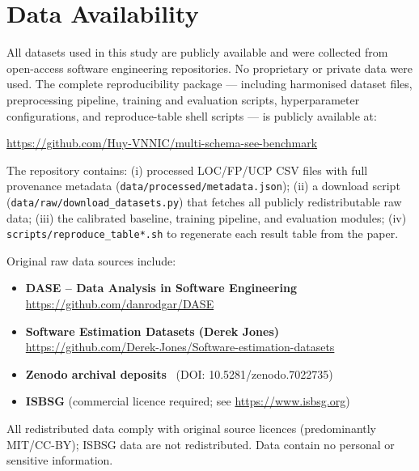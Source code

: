 \documentclass{ieeeaccess}
\begin{document}

\section*{Data Availability}
\raggedright
All datasets used in this study are publicly available and were collected from
open-access software engineering repositories. No proprietary or private data were used.
The complete reproducibility package --- including harmonised dataset files, preprocessing
pipeline, training and evaluation scripts, hyperparameter configurations, and
reproduce-table shell scripts --- is publicly available at:

\begin{center}
\url{https://github.com/Huy-VNNIC/multi-schema-see-benchmark}
\end{center}

\noindent The repository contains: (i) processed LOC/FP/UCP CSV files with full provenance
metadata (\texttt{data/processed/metadata.json}); (ii) a download script
(\texttt{data/raw/download\_datasets.py}) that fetches all publicly redistributable raw data;
(iii) the calibrated baseline, training pipeline, and evaluation modules;
(iv) \texttt{scripts/reproduce\_table*.sh} to regenerate each result table from the paper.

Original raw data sources include:

\begin{itemize}
    \item \textbf{DASE -- Data Analysis in Software Engineering}  
    \url{https://github.com/danrodgar/DASE}

    \item \textbf{Software Estimation Datasets (Derek Jones)}  
    \url{https://github.com/Derek-Jones/Software-estimation-datasets}

    \item \textbf{Zenodo archival deposits}~\cite{huynh2023stacking,zenodo7022735}
    (DOI: 10.5281/zenodo.7022735)

    \item \textbf{ISBSG} (commercial licence required; see \url{https://www.isbsg.org})
\end{itemize}

All redistributed data comply with original source licences (predominantly MIT/CC-BY);
ISBSG data are not redistributed. Data contain no personal or sensitive information.
\end{document}
